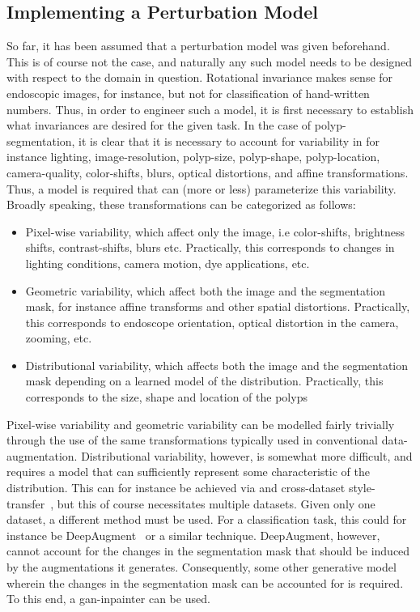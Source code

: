 \subsection{Implementing a Perturbation Model} \label{perturbations}
So far, it has been assumed that a perturbation model was given beforehand. This is of course not the case, and naturally any such model needs to be designed with respect to the domain in question. Rotational invariance makes sense for endoscopic images, for instance, but not for classification of hand-written numbers. Thus, in order to engineer such a model, it is first necessary to establish what invariances are desired for the given task. In the case of polyp-segmentation, it is clear that it is necessary to account for variability in for instance lighting, image-resolution, polyp-size, polyp-shape, polyp-location, camera-quality, color-shifts, blurs, optical distortions, and affine transformations. Thus, a model is required that can (more or less) parameterize this variability. Broadly speaking, these transformations can be categorized as follows:
\begin{itemize}
    \item Pixel-wise variability, which affect only the image, i.e color-shifts, brightness shifts, contrast-shifts,  blurs etc. Practically, this corresponds to changes in lighting conditions, camera motion, dye applications, etc.
    \item Geometric variability, which affect both the image and the segmentation mask, for instance affine transforms and other spatial distortions. Practically, this corresponds to endoscope orientation, optical distortion in the camera, zooming, etc. 
    \item Distributional variability, which affects both the image and the segmentation mask depending on a learned model of the distribution. Practically, this corresponds to the size, shape and location of the polyps
\end{itemize}
Pixel-wise variability and geometric variability can be modelled fairly trivially through the use of the same transformations typically used in conventional data-augmentation. Distributional variability, however, is somewhat more difficult, and requires a model that can sufficiently represent some characteristic of the distribution. This can for instance be achieved via and cross-dataset style-transfer~\cite{cyclegan, modelbased}, but this of course necessitates multiple datasets. Given only one dataset, a different method must be used. For a classification task, this could for instance be DeepAugment~\cite{deepaugment} or a similar technique. DeepAugment, however, cannot account for the changes in the segmentation mask that should be induced by the augmentations it generates. Consequently, some other generative model wherein the changes in the segmentation mask can be accounted for is required. To this end, a \gls{gan}-inpainter can be used. 

